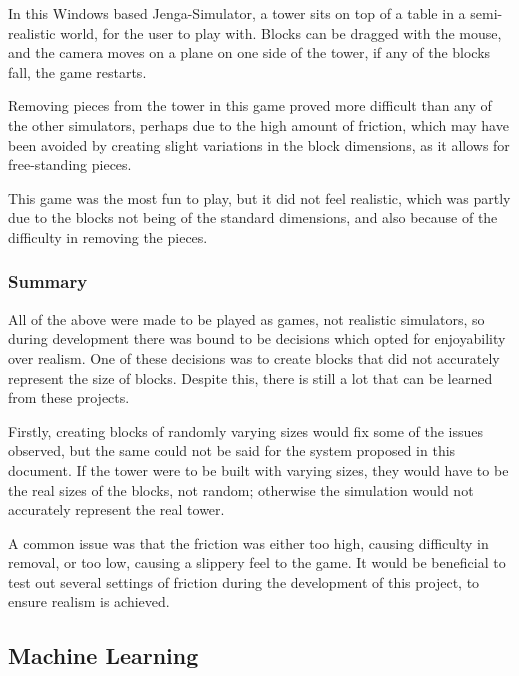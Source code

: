 In this Windows based Jenga-Simulator, a \jenga{} tower sits on top of a table in a semi-realistic world, for the user to play with. Blocks can be dragged with the mouse, and the camera moves on a plane on one side of the tower, if any of the blocks fall, the game restarts.

Removing pieces from the tower in this game proved more difficult than any of the other simulators, perhaps due to the high amount of friction, which may have been avoided by creating slight variations in the block dimensions, as it allows for free-standing pieces.

This game was the most fun to play, but it did not feel realistic, which was partly due to the blocks not being of the standard \jenga{} dimensions, and also because of the difficulty in removing the pieces.

\subsubsection{Summary}

All of the above were made to be played as games, not realistic simulators, so during development there was bound to be decisions which opted for enjoyability over realism. One of these decisions was to create blocks that did not accurately represent the size of \jenga{} blocks. Despite this, there is still a lot that can be learned from these projects.

Firstly, creating blocks of randomly varying sizes would fix some of the issues observed, but the same could not be said for the system proposed in this document.  If the tower were to be built with varying sizes, they would have to be the real sizes of the blocks, not random; otherwise the simulation would not accurately represent the real tower.

A common issue was that the friction was either too high, causing difficulty in removal, or too low, causing a slippery feel to the game. It would be beneficial to test out several settings of friction during the development of this project, to ensure realism is achieved.


\subsection{Machine Learning}\label{subsec:machinelearning}

